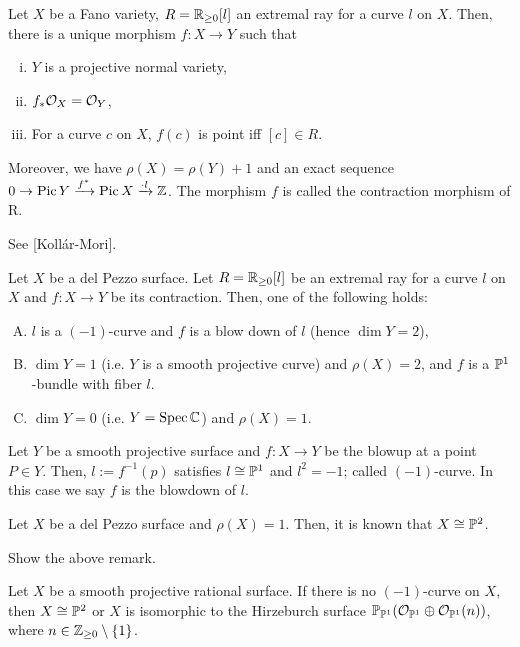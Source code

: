 \documentclass{../../small}
\DeclareMathOperator{\Pic}{Pic}
\begin{document}
\begin{thm}
Let $X$ be a Fano variety, $R=\R_{\ge0}[l]$ an extremal ray for a curve $l$ on $X$.
Then, there is a unique morphism $f:X\to Y$ such that
\begin{enumerate}[(i)]
\item $Y$ is a projective normal variety,
\item $f_*\cO_X=\cO_Y$,
\item For a curve $c$ on $X$, $f(c)$ is point iff $[c]\in R$.
\end{enumerate}
Moreover, we have $\rho(X)=\rho(Y)+1$ and an exact sequence $0\to\Pic Y\xrightarrow{f^*}\Pic X\xrightarrow{\cdot l}\Z$.
The morphism $f$ is called the contraction morphism of R.
\end{thm}
\begin{pf}
See [Koll\'ar-Mori].
\end{pf}

\begin{thm}
Let $X$ be a del Pezzo surface.
Let $R=\R_{\ge0}[l]$ be an extremal ray for a curve $l$ on $X$ and $f:X\to Y$ be its contraction.
Then, one of the following holds:
\begin{enumerate}[(A)]
\item $l$ is a $(-1)$-curve and $f$ is a blow down of $l$ (hence $\dim Y=2$),
\item $\dim Y=1$ (i.e. $Y$ is a smooth projective curve) and $\rho(X)=2$, and $f$ is a $\P^1$-bundle with fiber $l$.
\item $\dim Y=0$ (i.e. $Y=\Spec\C$) and $\rho(X)=1$.
\end{enumerate}
\end{thm}

\begin{rmk}
Let $Y$ be a smooth projective surface and $f:X\to Y$ be the blowup at a point $P\in Y$.
Then, $l:=f^{-1}(p)$ satisfies $l\cong\P^1$ and $l^2=-1$; called $(-1)$-curve.
In this case we say $f$ is the blowdown of $l$.
\end{rmk}

\begin{rmk}
Let $X$ be a del Pezzo surface and $\rho(X)=1$.
Then, it is known that $X\cong\P^2$.
\end{rmk}

\begin{exe}
Show the above remark.
\end{exe}

\begin{rmk}
Let $X$ be a smooth projective rational surface.
If there is no $(-1)$-curve on $X$, then $X\cong \P^2$ or $X$ is isomorphic to the Hirzeburch surface $\P_{\P^1}(\cO_{\P^1}\oplus\cO_{\P^1}(n))$, where $n\in\Z_{\ge0}\setminus\{1\}$.
\end{rmk}
\end{document}
